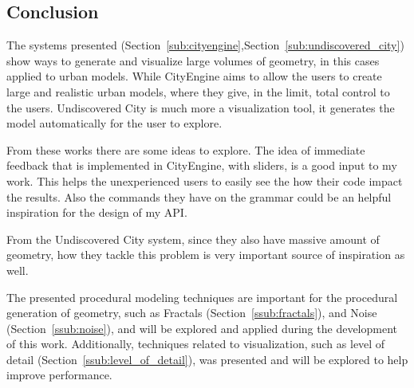 


\subsection{Conclusion} %
\label{sub:conclusion}

The systems presented (Section~\ref{sub:cityengine},Section~\ref{sub:undiscovered_city}) show ways to generate and visualize large volumes of geometry, in this cases applied to urban models. While CityEngine \cite{Parish2001} aims to allow the users to create large and realistic urban models, where they give, in the limit, total control to the users. Undiscovered City\cite{Greuter2003} is much more a visualization tool, it generates the model automatically for the user to explore.

From these works there are some ideas to explore. The idea of immediate feedback that is implemented in CityEngine, with sliders, is a good input to my work. This helps the unexperienced users to easily see the how their code impact the results. Also the commands they have on the grammar could be an helpful inspiration for the design of my API.

From the Undiscovered City system, since they also have massive amount of geometry, how they tackle this problem is very important source of inspiration as well.

The presented procedural modeling techniques are important for the procedural generation of geometry, such as Fractals (Section~\ref{ssub:fractals}), and Noise (Section~\ref{ssub:noise}), and will be explored and applied during the development of this work. Additionally, techniques related to visualization, such as level of detail (Section~\ref{ssub:level_of_detail}), was presented and will be explored to help improve performance.





%
%
%
%






